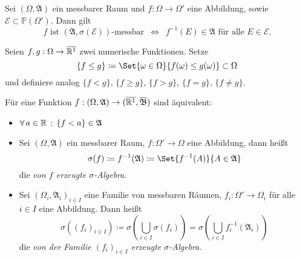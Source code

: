 \documentclass{cheat-sheet}
\newcommand{\Alg}{\mathfrak{A}} %
\renewcommand{\P}{\mathbb{P}} %
\newcommand{\Bor}{\mathfrak{B}} %
\renewcommand{\ER}{\overline{\R^1}} %
\begin{document}
\begin{lem}
  Sei $(\Omega, \Alg)$ ein messbarer Raum und $f : \Omega \to \Omega'$ eine Abbildung, sowie $\mathcal{E} \subset \P(\Omega')$. Dann gilt
  \[ f \text{ ist $(\Alg, \sigma(\mathcal{E}))$-messbar} \enspace \iff \enspace f^{-1}(E) \in \Alg \text{ für alle } E \in \mathcal{E}. \]
\end{lem}

\begin{nota}
  Seien $f, g : \Omega \to \ER$ zwei numerische Funktionen. Setze
    \[ \{ f \leq g \} \coloneqq \Set{ \omega \in \Omega }{ f(\omega) \leq g(\omega) } \subset \Omega \]
  und definiere analog $\{ f < g \}$, $\{ f \geq g \}$, $\{ f > g \}$, $\{ f = g \}$, $\{ f \not= g \}$.
\end{nota}

\begin{satz}
  Für eine Funktion $f : (\Omega, \Alg) \to (\ER, \overline{\Bor})$ sind äquivalent:
  \begin{itemize}
    \miniitem{0.7 \linewidth}{$\forall \, a \in \R \,:\, \{ f \geq a \} = f^{-1}([a, \infty]) \in \Alg$}
    \item $\fa{a \in \R} \{ f < a \} \in \Alg$
  \end{itemize}
\end{satz}

\begin{defn}
  \begin{itemize}
    \item Sei $(\Omega, \Alg)$ ein messbarer Raum, $f : \Omega' \to \Omega$ eine Abbildung, dann heißt
    \[ \sigma(f) \coloneqq f^{-1}(\Alg) \coloneqq \Set{ f^{-1}(A) }{ A \in \Alg } \]
    die \emph{von $f$ erzeugte $\sigma$-Algebra}.
    \item Sei $(\Omega_i, \Alg_i)_{i \in I}$ eine Familie von messbaren Räumen, $f_i : \Omega' \to \Omega_i$ für alle $i \in I$ eine Abbildung. Dann heißt
    \[ \sigma((f_i)_{i \in I}) \coloneqq \sigma(\bigcup_{i \in I} \sigma(f_i)) = \sigma(\bigcup_{i \in I} f_i^{-1}(\Alg_i)) \]
    die \emph{von der Familie $(f_i)_{i \in I}$ erzeugte $\sigma$-Algebra}.
  \end{itemize}
\end{defn}
\end{document}
